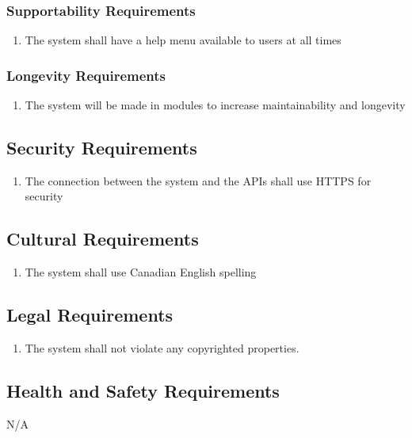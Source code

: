 \documentclass[12pt, titlepage]{article}
\begin{document}
\subsubsection{Supportability Requirements}
\begin{enumerate}[start=4, label={MS\arabic*.}]
    \item The system shall have a help menu available to users at all times
\end{enumerate}
\subsubsection{Longevity Requirements}
\begin{enumerate}[start=5, label={MS\arabic*.}]
	\item The system will be made in modules to increase maintainability and longevity
\end{enumerate}

\subsection{Security Requirements}
\begin{enumerate}[start=1, label={S\arabic*.}]
    \item The connection between the system and the APIs shall use HTTPS for security
\end{enumerate}

\subsection{Cultural Requirements}
\begin{enumerate}[start=1, label={C\arabic*.}]
    \item The system shall use Canadian English spelling
\end{enumerate}

\subsection{Legal Requirements}
\begin{enumerate}[start=1, label={L\arabic*.}]
    \item The system shall not violate any copyrighted properties.
\end{enumerate}

\subsection{Health and Safety Requirements}
N/A
\end{document}
